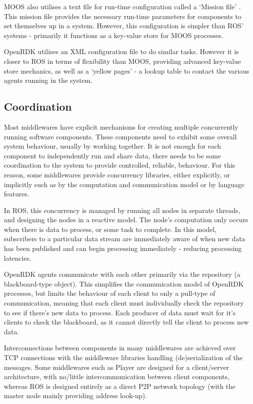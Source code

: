 \documentclass[../dissertation.tex]{subfiles}
\begin{document}
MOOS also utilises a text file for run-time configuration called a `Mission file' \cite{newman2009introduction}. This mission file provides the necessary run-time parameters for components to set themselves up in a system. However, this configuration is simpler than ROS' systems - primarily it functions as a key-value store for MOOS processes.

OpenRDK utilises an XML configuration file to do similar tasks. However it is closer to ROS in terms of flexibility than MOOS, providing advanced key-value store mechanics, as well as a `yellow pages' - a lookup table to contact the various agents running in the system.

\subsection{Coordination}
\label{coordination-section}

Most middlewares have explicit mechanisms for creating multiple concurrently running software components. These components need to exhibit some overall system behaviour, usually by working together. It is not enough for each component to independently run and share data, there needs to be some coordination to the system to provide controlled, reliable, behaviour. For this reason, some middlewares provide concurrency libraries, either explicitly, or implicitly such as by the computation and communication model or by language features.

In ROS, this concurrency is managed by running all nodes in separate threads, and designing the nodes in a reactive model. The node's computation only occurs when there is data to process, or some task to complete. In this model, subscribers to a particular data stream are immediately aware of when new data has been published and can begin processing immediately - reducing processing latencies.

OpenRDK agents communicate with each other primarily via the repository (a blackboard-type object). This simplifies the communication model of OpenRDK processes, but limits the behaviour of each client to only a pull-type of communication, meaning that each client must individually check the repository to see if there's new data to process. Each producer of data must wait for it's clients to check the blackboard, as it cannot directly tell the client to process new data.

Interconnections between components in many middlewares are achieved over TCP connections with the middleware libraries handling (de)serialization of the messages. Some middlewares such as Player are designed for a client/server architecture, with no/little intercommunication between client components, whereas ROS is designed entirely as a direct P2P network topology (with the master node mainly providing address look-up).
\end{document}

